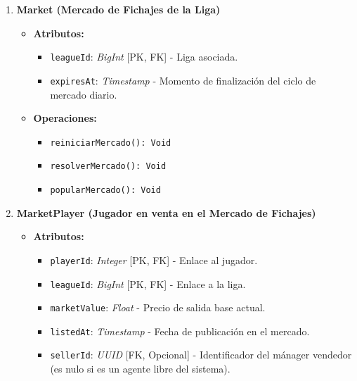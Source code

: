 \begin{enumerate}
    \item \textbf{Market (Mercado de Fichajes de la Liga)}
    \begin{itemize}
        \item \textbf{Atributos:}
            \begin{itemize}
                \item \texttt{leagueId}: \textit{BigInt} [PK, FK] - Liga asociada.
                \item \texttt{expiresAt}: \textit{Timestamp} - Momento de finalización del ciclo de mercado diario.
            \end{itemize}
        \item \textbf{Operaciones:}
            \begin{itemize}
                \item \texttt{reiniciarMercado(): Void}
                \item \texttt{resolverMercado(): Void}                
                \item \texttt{popularMercado(): Void}
            \end{itemize}
    \end{itemize}

    \item \textbf{MarketPlayer (Jugador en venta en el Mercado de Fichajes)}
    \begin{itemize}
        \item \textbf{Atributos:}
            \begin{itemize}
                \item \texttt{playerId}: \textit{Integer} [PK, FK] - Enlace al jugador.
                \item \texttt{leagueId}: \textit{BigInt} [PK, FK] - Enlace a la liga.
                \item \texttt{marketValue}: \textit{Float} - Precio de salida base actual.
                \item \texttt{listedAt}: \textit{Timestamp} - Fecha de publicación en el mercado.
                \item \texttt{sellerId}: \textit{UUID} [FK, Opcional] - Identificador del mánager vendedor (es nulo si es un agente libre del sistema).
            \end{itemize}
    \end{itemize}


\end{enumerate}
